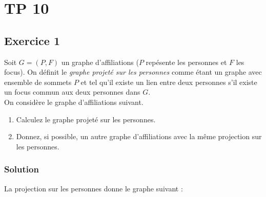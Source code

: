 \section{TP 10}


\subsection*{Exercice 1}
Soit $G = (P, F)$ un graphe d'affiliations ($P$ rep\'{e}sente les personnes et $F$ les focus). On d\'{e}finit le \emph{graphe projet\'{e} sur les personnes} comme \'{e}tant un graphe avec ensemble de sommets $P$ et tel qu'il existe un lien entre deux personnes s'il existe un focus commun aux deux personnes dans $G$. \\

On consid\`{e}re le graphe d'affiliations suivant.
\begin{center}
\end{center}

\begin{enumerate}
\item Calculez le graphe projet\'{e} sur les personnes.

\item Donnez, si possible, un autre graphe d'affiliations avec la m\^{e}me projection sur les personnes.
\end{enumerate}

    \subsubsection*{Solution}
    La projection sur les personnes donne le graphe suivant :
    
